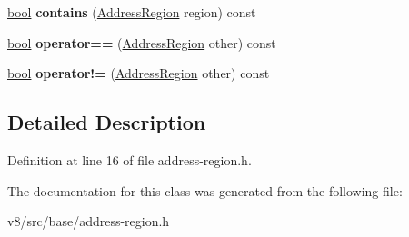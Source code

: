 \begin{DoxyCompactItemize}
\item 
\mbox{\label{classv8_1_1base_1_1AddressRegion_adb1e8e26a9b054bc9b5a9d0ed28bf21a}} 
\mbox{\hyperlink{classbool}{bool}} {\bfseries contains} (\mbox{\hyperlink{classv8_1_1base_1_1AddressRegion}{Address\+Region}} region) const
\item 
\mbox{\label{classv8_1_1base_1_1AddressRegion_a9f26a1c69ea1fb358968a68fa9597fc0}} 
\mbox{\hyperlink{classbool}{bool}} {\bfseries operator==} (\mbox{\hyperlink{classv8_1_1base_1_1AddressRegion}{Address\+Region}} other) const
\item 
\mbox{\label{classv8_1_1base_1_1AddressRegion_af52465d53b0ab5400a453d75d649d45d}} 
\mbox{\hyperlink{classbool}{bool}} {\bfseries operator!=} (\mbox{\hyperlink{classv8_1_1base_1_1AddressRegion}{Address\+Region}} other) const
\end{DoxyCompactItemize}


\subsection{Detailed Description}


Definition at line 16 of file address-\/region.\+h.



The documentation for this class was generated from the following file\+:\begin{DoxyCompactItemize}
\item 
v8/src/base/address-\/region.\+h\end{DoxyCompactItemize}

